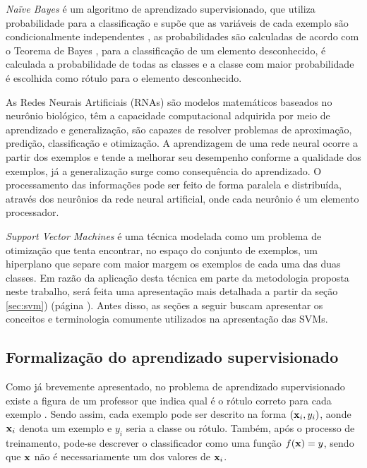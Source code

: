 \emph{Naïve Bayes} é um algoritmo de aprendizado supervisionado, que
utiliza probabilidade para a classificação e supõe que as variáveis de cada
exemplo são condicionalmente independentes \cite{de-categorizacao}, as
probabilidades são calculadas de acordo com o Teorema de Bayes
\cite{kim2003poisson}, para a classificação de um elemento desconhecido, é
calculada a probabilidade de todas as classes e a classe com maior
probabilidade é escolhida como rótulo para o elemento desconhecido.
~\cite{pardo2002aprendizado}

As Redes Neurais Artificiais (RNAs) são modelos matemáticos baseados no neurônio biológico, têm a capacidade computacional adquirida por meio de aprendizado e generalização, são capazes de resolver problemas de aproximação, predição, classificação e otimização. A aprendizagem de uma rede neural ocorre a partir dos exemplos e tende a melhorar seu desempenho conforme a qualidade dos exemplos, já a generalização surge como consequência do aprendizado. O processamento das informações pode ser feito de forma paralela e distribuída, através dos neurônios da rede neural artificial, onde cada neurônio é um elemento processador.~\cite{rezende2003sistemas}

\emph{Support Vector Machines} é uma técnica modelada como um problema de otimização que tenta encontrar, no espaço do conjunto de exemplos, um hiperplano que separe com maior margem os exemplos de cada uma das duas classes. Em razão da aplicação desta técnica em parte da metodologia proposta neste trabalho, será feita uma apresentação mais detalhada a partir da seção \ref{sec:svm}) (página \pageref{sec:svm}). Antes disso, as seções a seguir buscam apresentar os conceitos e terminologia comumente utilizados na apresentação das SVMs.

\subsection{Formalização do aprendizado supervisionado}

Como já brevemente apresentado, no problema de aprendizado supervisionado existe a figura de um professor que indica qual é o rótulo correto para cada exemplo . Sendo assim, cada exemplo pode ser descrito na forma $(\mathbf{x}_i, y_i)$, aonde $\mathbf{x}_i$ denota um exemplo e $y_i$ seria a classe ou rótulo. Também, após o processo de treinamento, pode-se descrever o classificador como uma função $f(\mathbf{x}) = y$, sendo que $\mathbf{x}$ não é necessariamente um dos valores de $\mathbf{x}_i$.

